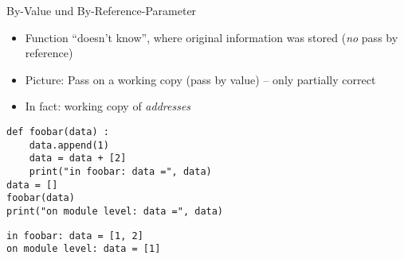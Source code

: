
\begin{frame}[fragile]{By-Value und By-Reference-Parameter}
%
\begin{itemize}
\item Function \enquote{doesn't know}, where original information was stored (\emph{no} pass by reference)
\item Picture: Pass on a working copy (pass by value) -- only partially correct
\item In fact: working copy of \emph{addresses}
\end{itemize}
%
\begin{tcbraster}[raster columns=2,
                  raster equal height,
                  nobeforeafter,
                  raster column skip=0.5cm]
\begin{codebox}
\begin{verbatim}
def foobar(data) :
    data.append(1)
    data = data + [2]
    print("in foobar: data =", data)
data = []
foobar(data)
print("on module level: data =", data)
\end{verbatim}
\end{codebox}
%
\begin{cmdbox}
\begin{verbatim}
in foobar: data = [1, 2]
on module level: data = [1]
\end{verbatim}
\end{cmdbox}
\end{tcbraster}
%
\end{frame}


